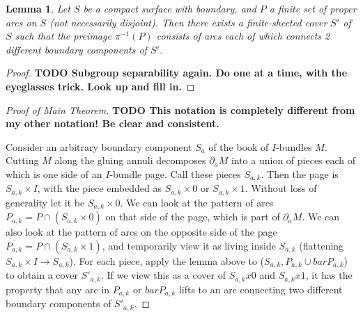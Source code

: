 \documentclass[12pt]{amsart}
\newtheorem{lemma}[theorem]{Lemma}
\theoremstyle{definition}
\theoremstyle{remark}
\newcommand{\bd}{\partial}
\begin{document}
\begin{lemma}

Let $S$ be a compact surface with boundary, and $P$ a finite set of proper arcs
on $S$ (not necessarily disjoint).  Then there exists a finite-sheeted cover
$S'$ of $S$ such that the preimage $\pi^{-1}(P)$ consists of arcs each of which
connects 2 different boundary components of $S'$.

\end{lemma}

\begin{proof}

\textbf{ TODO Subgroup separability again. Do one at a time, with the eyeglasses
trick.  Look up and fill in.}

\end{proof}

\begin{proof}[Proof of Main Theorem]


\textbf{ TODO This notation is completely different from my other notation! Be
clear and consistent.}

Consider an arbitrary boundary component $S_a$ of the book of $I$-bundles $M$.
Cutting $M$ along the gluing annuli decomposes $\bd_aM$ into a union of pieces
each of which is one side of an $I$-bundle page. Call these pieces $S_{a,k}$.
Then the page is $S_{a,k}\times I$, with the piece embedded as $S_{a,k}\times
0$ or $S_{a,k}\times 1$. Without loss of generality let it be $S_{a,k}\times
0$. We can look at the pattern of arcs $P_{a,k} = P \cap (S_{a,k}\times 0)$ on
that side of the page, which is part of $\bd_aM$. We can also look at the pattern
of arcs on the opposite side of the page $\overline{P_{a,k}} = P \cap
(S_{a,k}\times 1)$, and temporarily view it as living inside $S_{a,k}$
(flattening $S_{a,k}\times I \to S_{a,k}$).  For each piece, apply the lemma
above to ($S_{a,k},P_{a,k} \cup barP_{a,k}$) to obtain a cover $S'_{a,k}$. If we
view this as a cover of $S_{a,k}x0$ and $S_{a,k}x1$, it has the property that
any arc in $P_{a,k}$ or $barP_{a,k}$ lifts to an arc connecting two different
boundary components of $S'_{a,k}$.


\end{proof}
\end{document}
